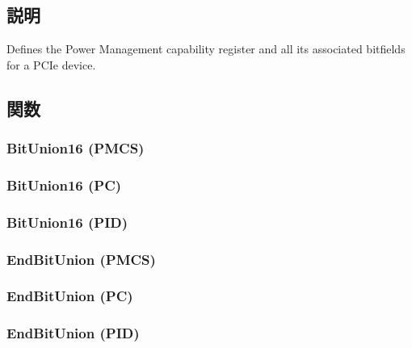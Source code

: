 \subsection{説明}
Defines the Power Management capability register and all its associated bitfields for a PCIe device. 

\subsection{関数}
\hypertarget{structPMCAP_afbe3a74de541f2ffa605ff001cb14c98}{
\subsubsection[{BitUnion16}]{\setlength{\rightskip}{0pt plus 5cm}BitUnion16 (PMCS)}}
\label{structPMCAP_afbe3a74de541f2ffa605ff001cb14c98}
\hypertarget{structPMCAP_adb9a568f979d58492fd21cd0d21da27d}{
\subsubsection[{BitUnion16}]{\setlength{\rightskip}{0pt plus 5cm}BitUnion16 (PC)}}
\label{structPMCAP_adb9a568f979d58492fd21cd0d21da27d}
\hypertarget{structPMCAP_aa1e479f4bbb94b0668585424113d9e79}{
\subsubsection[{BitUnion16}]{\setlength{\rightskip}{0pt plus 5cm}BitUnion16 (PID)}}
\label{structPMCAP_aa1e479f4bbb94b0668585424113d9e79}
\hypertarget{structPMCAP_ad586025c7dc3a20be7939b9f02cf28f0}{
\subsubsection[{EndBitUnion}]{\setlength{\rightskip}{0pt plus 5cm}EndBitUnion (PMCS)}}
\label{structPMCAP_ad586025c7dc3a20be7939b9f02cf28f0}
\hypertarget{structPMCAP_a23d341fe3de23bec9861fe969ec80c29}{
\subsubsection[{EndBitUnion}]{\setlength{\rightskip}{0pt plus 5cm}EndBitUnion (PC)}}
\label{structPMCAP_a23d341fe3de23bec9861fe969ec80c29}
\hypertarget{structPMCAP_a28badbba1f7c155353fa010e40de8616}{
\subsubsection[{EndBitUnion}]{\setlength{\rightskip}{0pt plus 5cm}EndBitUnion (PID)}}
\label{structPMCAP_a28badbba1f7c155353fa010e40de8616}


